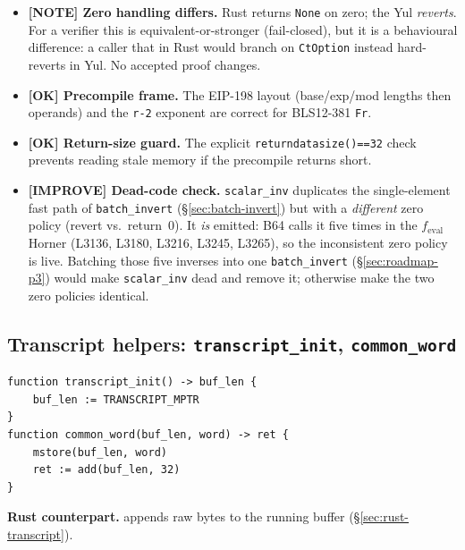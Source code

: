\begin{itemize}
  \item \textcolor{mathpurple}{\textbf{[NOTE] Zero handling differs.}}
        Rust returns \texttt{None} on zero; the Yul \emph{reverts}.
        For a verifier this is equivalent-or-stronger (fail-closed), but
        it is a behavioural difference: a caller that in Rust would
        branch on \texttt{CtOption} instead hard-reverts in Yul. No
        accepted proof changes.
  \item \textcolor{tracegreen}{\textbf{[OK] Precompile frame.}} The
        EIP-198 layout (base/exp/mod lengths then operands) and the
        \texttt{r-2} exponent are correct for BLS12-381 \texttt{Fr}.
  \item \textcolor{tracegreen}{\textbf{[OK] Return-size guard.}} The
        explicit \texttt{returndatasize()==32} check prevents reading
        stale memory if the precompile returns short.
  \item \textcolor{codegenblue}{\textbf{[IMPROVE] Dead-code check.}}
        \texttt{scalar\_inv} duplicates the single-element fast path of
        \texttt{batch\_invert} (\S\ref{sec:batch-invert}) but with a
        \emph{different} zero policy (revert vs.\ return~0). It
        \emph{is} emitted: B64 calls it five times in the
        $f_\text{eval}$ Horner (L3136, L3180, L3216, L3245, L3265), so
        the inconsistent zero policy is live. Batching those five
        inverses into one \texttt{batch\_invert} (\S\ref{sec:roadmap-p3})
        would make \texttt{scalar\_inv} dead and remove it; otherwise
        make the two zero policies identical. 
\end{itemize}

\subsection{Transcript helpers: \texttt{transcript\_init}, \texttt{common\_word}}
\label{sec:transcript-helpers}

\begin{lstlisting}[style=yul]
function transcript_init() -> buf_len {
    buf_len := TRANSCRIPT_MPTR
}
function common_word(buf_len, word) -> ret {
    mstore(buf_len, word)
    ret := add(buf_len, 32)
}
\end{lstlisting}

\textbf{Rust counterpart.}  appends raw
bytes to the running buffer (\S\ref{sec:rust-transcript}).

